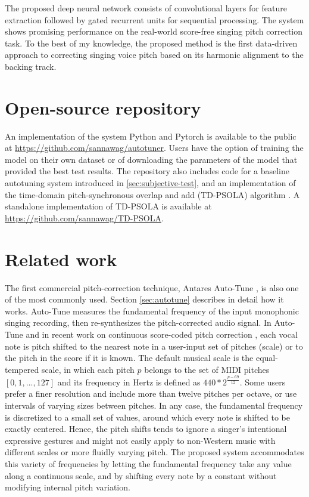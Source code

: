 The proposed deep neural network consists of convolutional layers for feature extraction followed by gated recurrent units for sequential processing. The system shows promising performance on the real-world score-free singing pitch correction task. To the best of my knowledge, the proposed method is the first data-driven approach to correcting singing voice pitch based on its harmonic alignment to the backing track.

\section{Open-source repository}
An implementation of the system Python and Pytorch is available to the public at \url{https://github.com/sannawag/autotuner}. Users have the option of training the model on their own dataset or of downloading the parameters of the model that provided the best test results. The repository also includes code for a baseline autotuning system introduced in \ref{sec:subjective-test}, and an implementation of the time-domain pitch-synchronous overlap and add (TD-PSOLA) algorithm \cite{charpentier1986diphone}. A standalone implementation of TD-PSOLA is available at \url{https://github.com/sannawag/TD-PSOLA}.

\section{Related work}
The first commercial pitch-correction technique, Antares Auto-Tune \cite{antares:2016}, is also one of the most commonly used. Section \ref{sec:autotune} describes in detail how it works. Auto-Tune measures the fundamental frequency of the input monophonic singing recording, then re-synthesizes the pitch-corrected audio signal. In Auto-Tune and in recent work on continuous score-coded pitch correction \cite{salazar2015continuous}, each vocal note is pitch shifted to the nearest note in a user-input set of pitches (scale) or to the pitch in the score if it is known. The default musical scale is the equal-tempered scale, in which each pitch $p$ belongs to the set of MIDI pitches $[0, 1, ..., 127]$ and its frequency in Hertz is defined as $440*2^{\frac{p-69}{12}}$. Some users prefer a finer resolution and include more than twelve pitches per octave, or use intervals of varying sizes between pitches. In any case, the fundamental frequency is discretized to a small set of values, around which every note is shifted to be exactly centered. Hence, the pitch shifts tends to ignore a singer's intentional expressive gestures and might not easily apply to non-Western music with different scales or more fluidly varying pitch. The proposed system accommodates this variety of frequencies by letting the fundamental frequency take any value along a continuous scale, and by shifting every note by a constant without modifying internal pitch variation.

